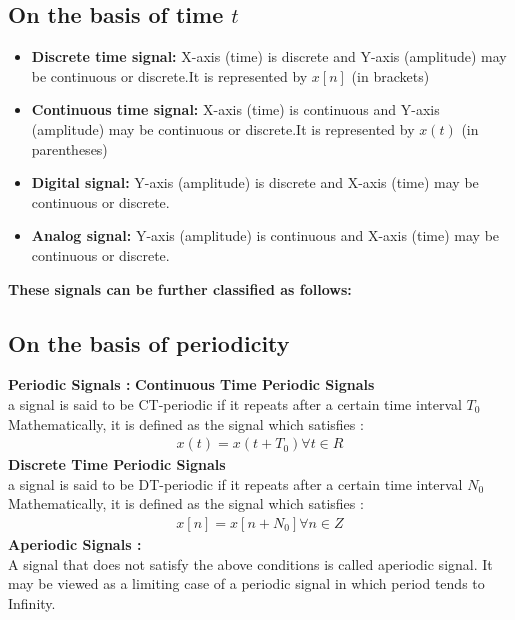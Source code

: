 \documentclass[a4paper,12pt]{book}
\begin{document}
\subsection*{\Large{On the basis of time $t$}}
\begin{itemize}
\item {\bf Discrete time signal:} X-axis (time) is discrete and Y-axis (amplitude) may be continuous or discrete.It is represented by $x[n]$ (in brackets)
\item {\bf Continuous time signal:} X-axis (time) is continuous and Y-axis (amplitude) may be continuous or discrete.It is represented by $x(t)$ (in parentheses)
\item {\bf Digital signal:} Y-axis (amplitude) is discrete and X-axis (time) may be continuous or discrete.
\item {\bf Analog signal:} Y-axis (amplitude) is continuous and X-axis (time) may be continuous or discrete. 
\end{itemize}

{\bf These signals can be further classified as follows:}
\subsection*{\Large{On the basis of periodicity}}
\textbf{Periodic Signals :}
{\bf Continuous Time Periodic Signals }\\
a signal is said to be CT-periodic if it repeats after a certain time interval $T_0$\\
Mathematically, it is defined as the signal which satisfies :\\
\begin{align*}
x(t)=x(t+T_0)  \forall  t  \in R
\end{align*}
{\bf Discrete Time Periodic Signals }\\
a signal is said to be DT-periodic if it repeats after a certain time interval $N_0$\\
Mathematically, it is defined as the signal which satisfies :\\
\begin{align*}
x[n]=x[n+N_0]  \forall  n  \in Z
\end{align*}
{\bf Aperiodic Signals :}\\ A signal that does not satisfy the above conditions is called aperiodic signal. It may be viewed as a limiting case of a periodic signal in which period tends to Infinity.
\end{document}
